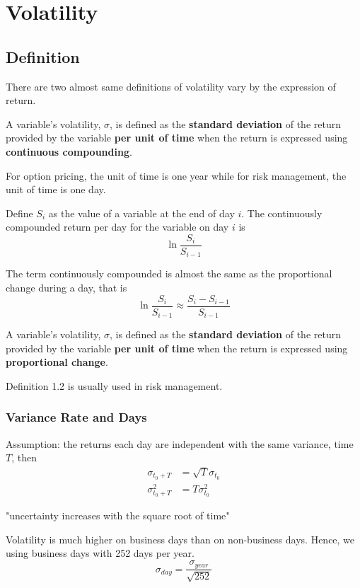 \section{Volatility}
\subsection{Definition}
There are two almost same definitions of volatility vary by the expression of return.
\begin{definition}[Volatility]
    A variable's volatility, $\sigma$, is defined as the \textbf{standard deviation} of the return provided by the variable \textbf{per unit of time} when the return is expressed using \textbf{continuous compounding}.
\end{definition}
\begin{remark}
    For option pricing, the unit of time is one year while for risk management, the unit of time is one day.
\end{remark}
\begin{remark}
    Define $S_{i}$ as the value of a variable at the end of day $i$. The continuously compounded return per day for the variable on day $i$ is
    $$
        \ln \frac{S_{i}}{S_{i-1}}
    $$
\end{remark}
\noindent The term continuously compounded is almost the same as the proportional change during a day, that is
$$
\ln \frac{S_{i}}{S_{i-1}} \approx \frac{S_{i}-S_{i-1}}{S_{i-1}}
$$
\begin{definition}[Volatility]
    A variable's volatility, $\sigma$, is defined as the \textbf{standard deviation} of the return provided by the variable \textbf{per unit of time} when the return is expressed using \textbf{proportional change}.
\end{definition}
\noindent Definition 1.2 is usually used in risk management.

\subsubsection{Variance Rate and Days}
Assumption: the returns each day are independent with the same variance, time $T$, then
\begin{align*}
    \sigma_{t_0+T} &= \sqrt{T} \sigma_{t_0}\\
    \sigma_{t_0+T}^2 &= T \sigma_{t_0}^2    
\end{align*}
\begin{center}
    "uncertainty increases with the square root of time"
\end{center}
Volatility is much higher on business days than on non-business days. Hence, we using business days with 252 days per year.
$$
\sigma_{day} = \frac{\sigma_{year}}{\sqrt{252}}
$$
